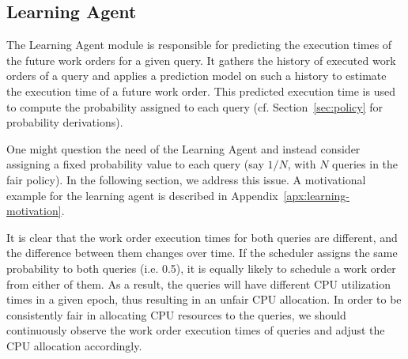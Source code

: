 \subsection{Learning Agent}\label{ssec:learning}
The Learning Agent module is responsible for predicting the execution times of the future work orders for a given query. 
It gathers the history of executed work orders of a query and applies a prediction model on such a history to estimate the execution time of a future work order.
This predicted execution time is used to compute the probability assigned to each query (cf. Section~\ref{sec:policy} for probability derivations).  

One might question the need of the Learning Agent and instead consider assigning a fixed probability value to each query (say $1/N$, with $N$ queries in the fair policy).
In the following section, we address this issue. 
A motivational example for the learning agent is described in Appendix~\ref{apx:learning-motivation}.

It is clear that the work order execution times for both queries are different, and the difference between them changes over time. 
If the scheduler assigns the same probability to both queries (i.e. 0.5), it is equally likely to schedule a work order from either of them. 
As a result, the queries will have different CPU utilization times in a given epoch, thus resulting in an unfair CPU allocation. 
In order to be consistently fair in allocating CPU resources to the queries, we should continuously observe the work order execution times of queries and adjust the CPU allocation accordingly. %

